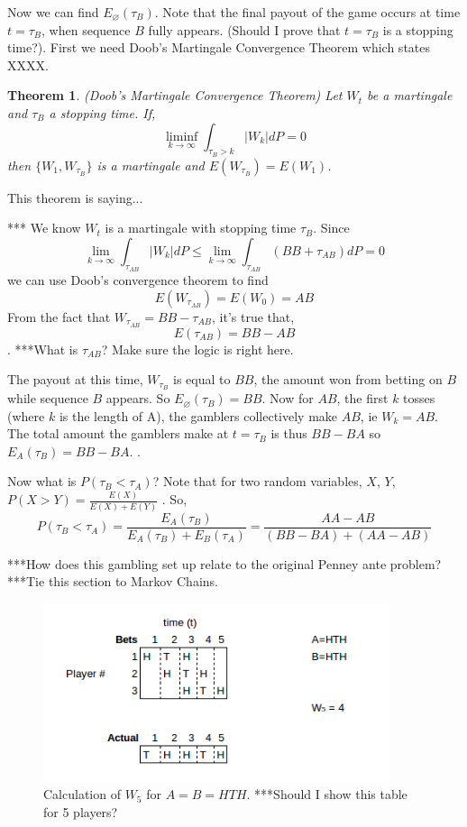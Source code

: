 \documentclass{article}
\newtheorem{theorem}{Theorem}[section]
\numberwithin{mytheorem}{subsection} %
\begin{document}
		Now we can find $E_{\varnothing}(\tau_{B})$. Note that the final payout of the game occurs at time $t=\tau_{B}$, when sequence $B$ fully appears. (Should I prove that $t=\tau_{B}$ is a stopping time?). First we need Doob's Martingale Convergence Theorem which states XXXX. 

		\begin{theorem}(Doob's Martingale Convergence Theorem)
			Let $W_t$ be a martingale and $\tau_B$ a stopping time. If,
			$$\liminf\limits_{k\rightarrow \infty} \int_{\tau_B > k} |W_k|dP = 0$$
			then $\{W_1, W_{\tau_B}\}$ is a martingale and $E(W_{\tau_B}) = E(W_1)$.
		\end{theorem}

		This theorem is saying... 

		***
		We know $W_t$ is a martingale with stopping time $\tau_B$. Since 
		$$\lim_{k\rightarrow \infty} \int_{\tau_{AB}} |W_k|dP 
		\leq \lim_{k\rightarrow \infty} \int_{\tau_{AB}} (BB + \tau_{AB}) dP = 0$$
		we can use Doob's convergence theorem to find
		$$E(W_{\tau_{AB}}) = E(W_0) = AB$$
		From the fact that $W_{\tau_{AB}} = BB - \tau_{AB}$, it's true that,
		$$E(\tau_{AB}) = BB - AB$$.
		***What is $\tau_{AB}$? Make sure the logic is right here.

		The payout at this time, $W_{\tau_{B}}$ is equal to $BB$, the amount won from betting on $B$ while sequence $B$ appears. So $E_{\varnothing}(\tau_{B}) = BB$. Now for $AB$, the first $k$ tosses (where $k$ is the length of A), the gamblers collectively make $AB$, ie $W_k = AB$. The total amount the gamblers make at $t = \tau_{B}$ is thus $BB - BA$ so $E_A(\tau_{B}) = BB - BA$. \cite{grinstead}.

		Now what is $P(\tau_{B} < \tau_{A})$? Note that for two random variables, $X$, $Y$, $P(X > Y) = \frac{E(X)}{E(X) + E(Y)}$ \cite{grinstead}. So, $$P(\tau_{B} < \tau_{A}) = \frac{E_A(\tau_{B})}{E_A(\tau_{B}) + E_B(\tau_{A})} = \frac{AA - AB}{(BB - BA) + (AA - AB)}$$

		***How does this gambling set up relate to the original Penney ante problem?
		***Tie this section to Markov Chains. 

		\begin{figure}[h]
			\begin{center}
				\includegraphics[width=4.0in]{Martingaletable}
			\end{center}
		
			\caption{Calculation of $W_5$ for $A = B = HTH$. ***Should I show this table for 5 players?}
			\label{fig}
		\end{figure}
\end{document}
